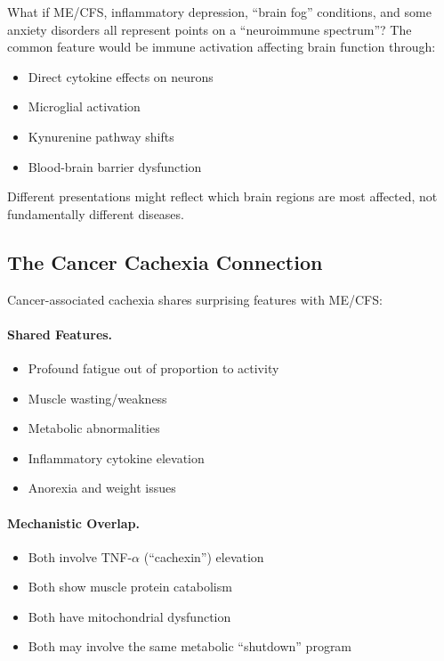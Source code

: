 \begin{open_question}
What if ME/CFS, inflammatory depression, ``brain fog'' conditions, and some anxiety disorders all represent points on a ``neuroimmune spectrum''? The common feature would be immune activation affecting brain function through:
\begin{itemize}
    \item Direct cytokine effects on neurons
    \item Microglial activation
    \item Kynurenine pathway shifts
    \item Blood-brain barrier dysfunction
\end{itemize}
Different presentations might reflect which brain regions are most affected, not fundamentally different diseases.
\end{open_question}

\subsection{The Cancer Cachexia Connection}

Cancer-associated cachexia shares surprising features with ME/CFS:

\paragraph{Shared Features.}
\begin{itemize}
    \item Profound fatigue out of proportion to activity
    \item Muscle wasting/weakness
    \item Metabolic abnormalities
    \item Inflammatory cytokine elevation
    \item Anorexia and weight issues
\end{itemize}

\paragraph{Mechanistic Overlap.}
\begin{itemize}
    \item Both involve TNF-$\alpha$ (``cachexin'') elevation
    \item Both show muscle protein catabolism
    \item Both have mitochondrial dysfunction
    \item Both may involve the same metabolic ``shutdown'' program
\end{itemize}

